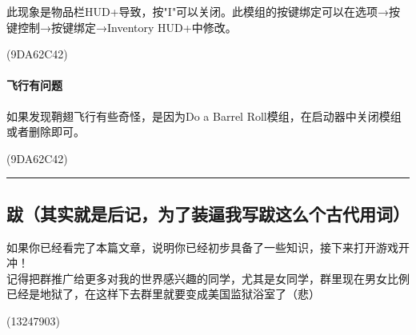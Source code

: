\documentclass[
]{article}
\begin{document}
此现象是物品栏HUD+导致，按"I"可以关闭。此模组的按键绑定可以在选项→按键控制→按键绑定→Inventory
HUD+中修改。

\begin{flushright}(9DA62C42)\end{flushright}

\paragraph{飞行有问题}\label{section-34}

如果发现鞘翅飞行有些奇怪，是因为Do a Barrel
Roll模组，在启动器中关闭模组或者删除即可。

\begin{flushright}(9DA62C42)\end{flushright}

\begin{center}\rule{0.5\linewidth}{0.5pt}\end{center}

\subsection{跋（其实就是后记，为了装逼我写跋这么个古代用词）}\label{section-35}

如果你已经看完了本篇文章，说明你已经初步具备了一些知识，接下来打开游戏开冲！\\
记得把群推广给更多对我的世界感兴趣的同学，尤其是女同学，群里现在男女比例已经是地狱了，在这样下去群里就要变成美国监狱浴室了（悲）

\begin{flushright}(13247903)\end{flushright}
\end{document}
